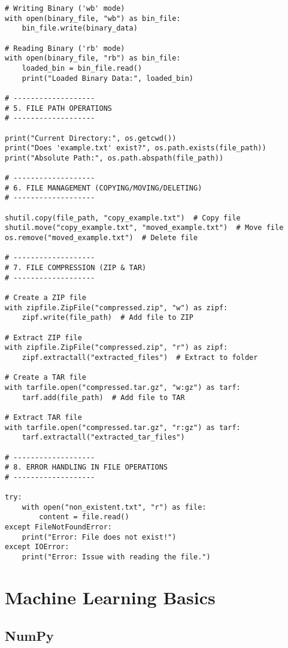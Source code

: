 \begin{verbatim}
# Writing Binary ('wb' mode)
with open(binary_file, "wb") as bin_file:
    bin_file.write(binary_data)

# Reading Binary ('rb' mode)
with open(binary_file, "rb") as bin_file:
    loaded_bin = bin_file.read()
    print("Loaded Binary Data:", loaded_bin)

# -------------------
# 5. FILE PATH OPERATIONS
# -------------------

print("Current Directory:", os.getcwd())
print("Does 'example.txt' exist?", os.path.exists(file_path))
print("Absolute Path:", os.path.abspath(file_path))

# -------------------
# 6. FILE MANAGEMENT (COPYING/MOVING/DELETING)
# -------------------

shutil.copy(file_path, "copy_example.txt")  # Copy file
shutil.move("copy_example.txt", "moved_example.txt")  # Move file
os.remove("moved_example.txt")  # Delete file

# -------------------
# 7. FILE COMPRESSION (ZIP & TAR)
# -------------------

# Create a ZIP file
with zipfile.ZipFile("compressed.zip", "w") as zipf:
    zipf.write(file_path)  # Add file to ZIP

# Extract ZIP file
with zipfile.ZipFile("compressed.zip", "r") as zipf:
    zipf.extractall("extracted_files")  # Extract to folder

# Create a TAR file
with tarfile.open("compressed.tar.gz", "w:gz") as tarf:
    tarf.add(file_path)  # Add file to TAR

# Extract TAR file
with tarfile.open("compressed.tar.gz", "r:gz") as tarf:
    tarf.extractall("extracted_tar_files")

# -------------------
# 8. ERROR HANDLING IN FILE OPERATIONS
# -------------------

try:
    with open("non_existent.txt", "r") as file:
        content = file.read()
except FileNotFoundError:
    print("Error: File does not exist!")
except IOError:
    print("Error: Issue with reading the file.")
\end{verbatim}

\section{Machine Learning Basics}

\subsection{NumPy}


